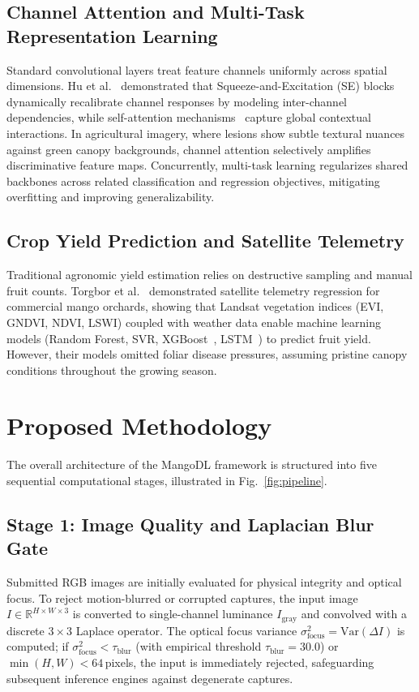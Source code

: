\documentclass[conference]{IEEEtran}
\begin{document}
\subsection{Channel Attention and Multi-Task Representation Learning}
Standard convolutional layers treat feature channels uniformly across spatial dimensions. Hu et al.~\cite{hu2018squeeze} demonstrated that Squeeze-and-Excitation (SE) blocks dynamically recalibrate channel responses by modeling inter-channel dependencies, while self-attention mechanisms~\cite{vaswani2017attention} capture global contextual interactions. In agricultural imagery, where lesions show subtle textural nuances against green canopy backgrounds, channel attention selectively amplifies discriminative feature maps. Concurrently, multi-task learning regularizes shared backbones across related classification and regression objectives, mitigating overfitting and improving generalizability.

\subsection{Crop Yield Prediction and Satellite Telemetry}
Traditional agronomic yield estimation relies on destructive sampling and manual fruit counts. Torgbor et al.~\cite{torgbor2023remote} demonstrated satellite telemetry regression for commercial mango orchards, showing that Landsat vegetation indices (EVI, GNDVI, NDVI, LSWI) coupled with weather data enable machine learning models (Random Forest, SVR, XGBoost~\cite{chen2016xgboost}, LSTM~\cite{hochreiter1997long}) to predict fruit yield. However, their models omitted foliar disease pressures, assuming pristine canopy conditions throughout the growing season.

\section{Proposed Methodology}

The overall architecture of the MangoDL framework is structured into five sequential computational stages, illustrated in Fig.~\ref{fig:pipeline}.

\subsection{Stage 1: Image Quality and Laplacian Blur Gate}
Submitted RGB images are initially evaluated for physical integrity and optical focus. To reject motion-blurred or corrupted captures, the input image $I \in \mathbb{R}^{H \times W \times 3}$ is converted to single-channel luminance $I_{\text{gray}}$ and convolved with a discrete $3 \times 3$ Laplace operator. The optical focus variance $\sigma_{\text{focus}}^2 = \text{Var}(\Delta I)$ is computed; if $\sigma_{\text{focus}}^2 < \tau_{\text{blur}}$ (with empirical threshold $\tau_{\text{blur}} = 30.0$) or $\min(H, W) < 64$\,pixels, the input is immediately rejected, safeguarding subsequent inference engines against degenerate captures.
\end{document}
